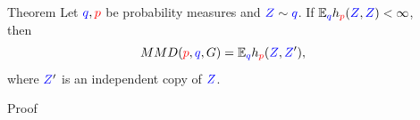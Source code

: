 \begin{frame}
\begin{columns}
\begin{column}{.33\linewidth}
\end{column}

\hspace{-1.45cm}
\begin{column}{.33\linewidth}


\begin{block}{Theorem}
\large
Let ${ \color{blue} q},{\color{red} p}$ be probability measures and ${ \color{blue} Z}\sim { \color{blue} q}$. 
If $\mathbb{E}_{{ \color{blue} q}} h_{{\color{red} p}}({ \color{blue} Z},{ \color{blue} Z})<\infty$, then 
$$MMD({\color{red} p},{ \color{blue} q},G) = \mathbb{E}_{{ \color{blue} q}} h_{{\color{red} p}}({ \color{blue} Z},{ \color{blue} Z}'),$$
where ${ \color{blue} Z}'$ is an independent copy of ${ \color{blue} Z}$.
\end{block}

\vspace{-0.73cm}
\begin{block}{Proof}


\end{block}
\end{column}
\end{columns}
\end{frame}
